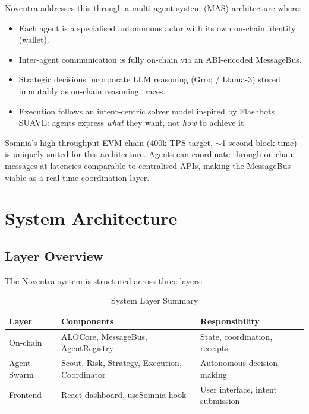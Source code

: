\documentclass[11pt,a4paper]{article}
\begin{document}
Noventra addresses this through a multi-agent system (MAS) architecture where:

\begin{itemize}[leftmargin=1.8em]
  \item Each agent is a specialised autonomous actor with its own on-chain identity (wallet).
  \item Inter-agent communication is fully on-chain via an ABI-encoded MessageBus.
  \item Strategic decisions incorporate LLM reasoning (Groq / Llama-3) stored immutably as
        on-chain reasoning traces.
  \item Execution follows an intent-centric solver model inspired by Flashbots SUAVE: agents
        express \emph{what} they want, not \emph{how} to achieve it.
\end{itemize}

Somnia's high-throughput EVM chain (400k TPS target, $\sim$1 second block time) is uniquely
suited for this architecture. Agents can coordinate through on-chain messages at latencies
comparable to centralised APIs, making the MessageBus viable as a real-time coordination layer.

\section{System Architecture}

\subsection{Layer Overview}

The Noventra system is structured across three layers:

\begin{table}[H]
\centering
\caption{System Layer Summary}
\begin{tabular}{@{}lll@{}}
  \toprule
  \textbf{Layer} & \textbf{Components} & \textbf{Responsibility} \\
  \midrule
  On-chain   & ALOCore, MessageBus, AgentRegistry & State, coordination, receipts \\
  Agent Swarm & Scout, Risk, Strategy, Execution, Coordinator & Autonomous decision-making \\
  Frontend   & React dashboard, useSomnia hook & User interface, intent submission \\
  \bottomrule
\end{tabular}
\end{table}
\end{document}
